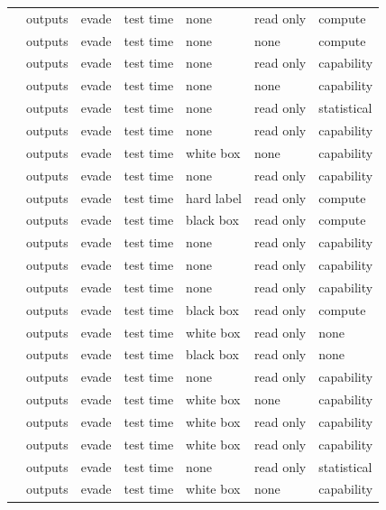 \begin{landscape}
\begin{longtable}{rllllll}
\cite{BPR19} & outputs & evade & test time & none & read only & compute \\
\cite{BLPR18} & outputs & evade & test time & none & none & compute \\
\cite{GMFSRWG18} & outputs & evade & test time & none & read only & capability \\
\cite{FFF18} & outputs & evade & test time & none & none & capability \\
\cite{AH23} & outputs & evade & test time & none & read only & statistical \\
\cite{LAGHJ19} & outputs & evade & test time & none & read only & capability \\
\cite{CRK19} & outputs & evade & test time & white box & none & capability \\
\cite{Mah19} & outputs & evade & test time & none & read only & capability \\
\cite{EMM20} & outputs & evade & test time & hard label & read only & compute \\
\cite{GJMM20} & outputs & evade & test time & black box & read only & compute \\
\cite{MDM19} & outputs & evade & test time & none & read only & capability \\
\cite{PSV23} & outputs & evade & test time & none & read only & capability \\
\cite{MZME19} & outputs & evade & test time & none & read only & capability \\
\cite{BGGKRR25} & outputs & evade & test time & black box & read only & compute \\
\cite{GCSGWVBHMB25} & outputs & evade & test time & white box & read only & none \\
\cite{FTHMLD25} & outputs & evade & test time & black box & read only & none \\
\cite{DMM19} & outputs & evade & test time & none & read only & capability \\
\cite{CYDS26} & outputs & evade & test time & white box & none & capability \\
\cite{ACW18} & outputs & evade & test time & white box & read only & capability \\
\cite{CAPBRTGMK19} & outputs & evade & test time & white box & read only & capability \\
\cite{CBM18} & outputs & evade & test time & none & read only & statistical \\
\cite{WK18} & outputs & evade & test time & white box & none & capability \\

\end{longtable}
\end{landscape}
